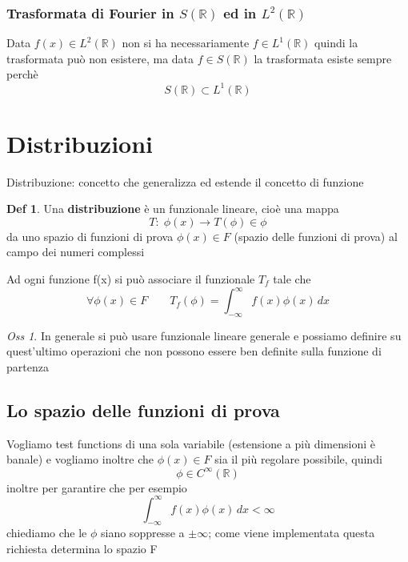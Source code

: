 \documentclass[a4paper,11pt]{report}
\theoremstyle{remark}
\newtheorem*{oss}{Oss}
\theoremstyle{definition}
\newtheorem*{Def}{Def}
\newcommand{\R}{\mathbb{R}}
\begin{document}
\section{Trasformata di Fourier in \texorpdfstring{$S(\R)$ ed in $L^2(\R)$}{U}}

Data $f(x) \in L^2(\R)$ non si ha necessariamente $f \in L^1(\R)$ quindi la trasformata può non esistere, ma data $f \in S(\R)$ la trasformata esiste sempre perchè 
\begin{equation*}
	S(\R) \subset L^1(\R) 
\end{equation*}


\part{Distribuzioni}

\noindent  Distribuzione: concetto che generalizza ed estende il concetto di funzione

\begin{Def}
	Una \textbf{distribuzione} è un funzionale lineare, cioè una mappa
	\begin{equation*}
		T: \; \phi(x) \to T(\phi) \in \phi
	\end{equation*}
	da uno spazio di funzioni di prova $\phi(x)\in F$ (spazio delle funzioni di prova) al campo dei numeri complessi
\end{Def}

\noindent Ad ogni funzione f(x) si può associare il funzionale $T_f$ tale che 
\begin{equation*}
	\forall \phi(x) \in F \qquad T_f (\phi) = \int_{-\infty}^\infty f(x)\phi(x)\, dx 
\end{equation*}

\begin{oss}
	In generale si può usare funzionale lineare generale e possiamo definire su quest'ultimo operazioni che non possono essere ben definite sulla funzione di partenza 	 
\end{oss}

\chapter{Lo spazio delle funzioni di prova}

Vogliamo test functions di una sola variabile (estensione a più dimensioni è banale) e vogliamo inoltre che $\phi(x)\in F$ sia il più regolare possibile, quindi
\begin{equation*}
	\phi \in C^\infty(\R)
\end{equation*}
inoltre per garantire che per esempio
\begin{equation*}
	\int_{-\infty}^\infty f(x)\phi(x)\, dx < \infty
\end{equation*}
chiediamo che le $\phi$ siano soppresse a $\pm \infty$; come viene implementata questa richiesta determina lo spazio F 
\end{document}
